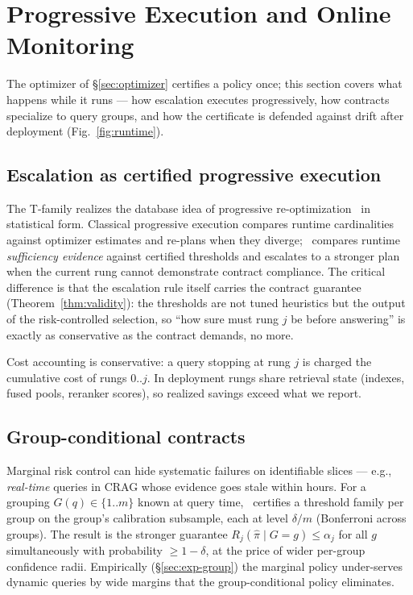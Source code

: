 \section{Progressive Execution and Online Monitoring}
\label{sec:runtime}



The optimizer of \S\ref{sec:optimizer} certifies a policy once; this
section covers what happens while it runs --- how escalation executes
progressively, how contracts specialize to query groups, and how the
certificate is defended against drift after deployment
(Fig.~\ref{fig:runtime}).

\subsection{Escalation as certified progressive execution}

The T-family realizes the database idea of progressive
re-optimization~\cite{kabra1998efficient,markl2004robust} in statistical
form. Classical progressive execution compares runtime cardinalities
against optimizer estimates and re-plans when they diverge; \system\
compares runtime \emph{sufficiency evidence} against certified thresholds
and escalates to a stronger plan when the current rung cannot demonstrate
contract compliance. The critical difference is that the escalation rule
itself carries the contract guarantee (Theorem~\ref{thm:validity}): the
thresholds are not tuned heuristics but the output of the risk-controlled
selection, so ``how sure must rung $j$ be before answering'' is exactly as
conservative as the contract demands, no more.

Cost accounting is conservative: a query stopping at rung $j$ is charged
the cumulative cost of rungs $0..j$. In deployment rungs share retrieval
state (indexes, fused pools, reranker scores), so realized savings exceed
what we report.

\subsection{Group-conditional contracts}
\label{sec:group}

Marginal risk control can hide systematic failures on identifiable slices
--- e.g., \emph{real-time} queries in CRAG whose evidence goes stale within
hours. For a grouping $G(q) \in \{1..m\}$ known at query time, \system\
certifies a threshold family per group on the group's calibration subsample,
each at level $\delta/m$ (Bonferroni across groups). The result is the
stronger guarantee $R_j(\hat\pi \mid G = g) \le \alpha_j$ for all $g$
simultaneously with probability $\ge 1-\delta$, at the price of wider
per-group confidence radii. Empirically (\S\ref{sec:exp-group}) the
marginal policy under-serves dynamic queries by wide margins that the
group-conditional policy eliminates.

